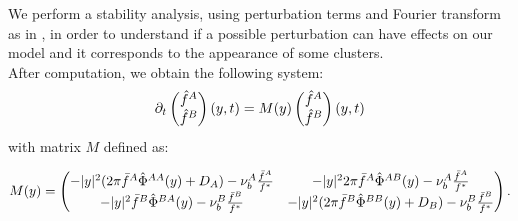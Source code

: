 We perform a stability analysis, using perturbation terms and Fourier transform as in \cite{twoparticule}, in order to understand if a possible perturbation can have effects on our model and it corresponds to the appearance of some clusters. \\
After computation, we obtain the following system:
\begin{align}
{\partial}_t \begin{pmatrix} \hat{f}^A \\ \hat{f}^B
\end{pmatrix}(y,t)=M(y)\begin{pmatrix} \hat{f}^A \\ \hat{f}^B
\end{pmatrix}(y,t)
\end{align}
with matrix $M$ defined as:

\begin{align}
M(y)=
 \begin{pmatrix} -|y|^2(2\pi{\bar{f}^A}{\hat{\Phi}^{AA}}(y)+D_A)-\nu_{b}^A\frac{{\bar{f}^A}}{f^*} & -|y|^22\pi{\bar{f}^A}{\hat{\Phi}^{AB}}(y)-\nu_{b}^A\frac{{\bar{f}^A}}{f^*} \\ 
-|y|^2{\bar{f}^B}{\hat{\Phi}^{BA}}(y)-\nu_{b}^B\frac{{\bar{f}^B}}{f^*} & -|y|^2(2\pi{\bar{f}^B}{\hat{\Phi}^{BB}}(y)+D_B)-\nu_{b}^B\frac{{\bar{f}^B}}{f^*} 
\end{pmatrix}.
\end{align}



